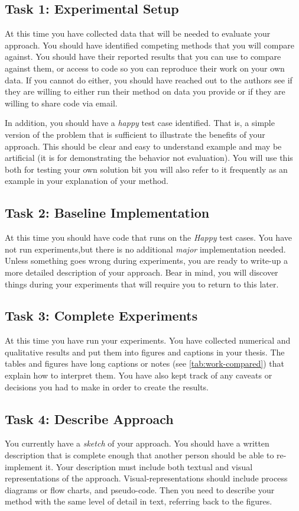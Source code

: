 \subsection{Task 1: Experimental Setup}\label{milestone:experimental-setup}
At this time you have collected data that will be needed to evaluate your approach. You should have identified competing methods that you will compare against. You should have their reported results that you can use to compare against them, or access to code so you can reproduce their work on your own data. If you cannot do either, you should have reached out to the authors see if they are willing to either run their method on data you provide or if they are willing to share code via email.

In addition, you should have a \textit{happy} test case identified. That is, a simple version of the problem that is sufficient to illustrate the benefits of your approach. This should be clear and easy to understand example and may be artificial (it is for demonstrating the behavior not evaluation).  You will use this both for testing your own solution bit you will also refer to it frequently as an example in your explanation of your method.

\subsection{Task 2: Baseline Implementation}
At this time you should have code that runs on the \textit{Happy} test cases. You have not run experiments,but there is no additional \emph{major} implementation needed. Unless something goes wrong during experiments, you are ready to write-up a more detailed description of your approach. Bear in mind, you will discover things during your experiments that will require you to return to this later.



\subsection{Task 3: Complete Experiments}
At this time you have run your experiments. You have collected numerical and qualitative results and put them into figures and captions in your thesis. The tables and figures have long captions or notes (see \ref{tab:work-compared}) that explain how to interpret them.
You have also kept track of any caveats or decisions you had to make in order to create the results.

\subsection{Task 4: Describe Approach}
You currently have a \textit{sketch} of your approach. You should have a written description that is complete enough that another person should be able to re-implement it. Your description must include both textual and visual representations of the approach. Visual-representations should include process diagrams or flow charts, and pseudo-code.  Then you need to describe your method with the same level of detail in text, referring back to the figures.

